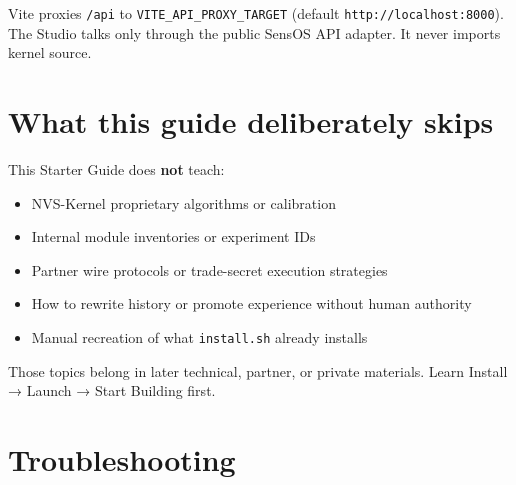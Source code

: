\documentclass[11pt,a4paper,oneside]{article}
\newcommand{\pathcode}[1]{\texttt{#1}}
\begin{document}
Vite proxies \pathcode{/api} to \pathcode{VITE\_API\_PROXY\_TARGET} (default \pathcode{http://localhost:8000}). The Studio talks only through the public SensOS API adapter. It never imports kernel source.

\section{What this guide deliberately skips}
\label{sec:skips}

This Starter Guide does \textbf{not} teach:

\begin{itemize}
  \item NVS-Kernel proprietary algorithms or calibration
  \item Internal module inventories or experiment IDs
  \item Partner wire protocols or trade-secret execution strategies
  \item How to rewrite history or promote experience without human authority
  \item Manual recreation of what \pathcode{install.sh} already installs
\end{itemize}

Those topics belong in later technical, partner, or private materials. Learn Install → Launch → Start Building first.

\section{Troubleshooting}
\label{sec:troubleshoot}
\end{document}
